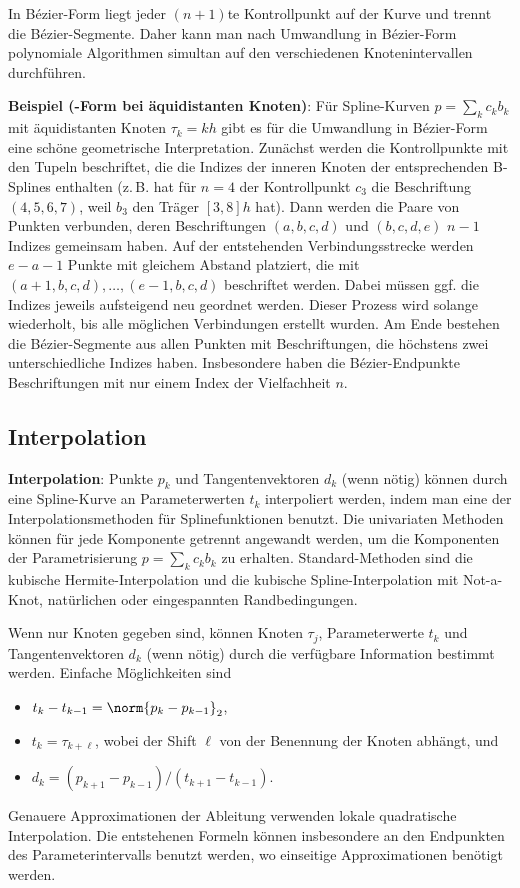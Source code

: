 In Bézier-Form liegt jeder $(n + 1)$te Kontrollpunkt auf der Kurve und trennt die Bézier-Segmente.
Daher kann man nach Umwandlung in Bézier-Form polynomiale Algorithmen simultan auf den
verschiedenen Knotenintervallen durchführen.

\linie
\pagebreak

\textbf{Beispiel (-Form bei äquidistanten Knoten)}:
Für Spline-Kurven $p = \sum_k c_k b_k$ mit äquidistanten Knoten $\tau_k = kh$ gibt es
für die Umwandlung in Bézier-Form eine schöne geometrische Interpretation.
Zunächst werden die Kontrollpunkte mit den Tupeln beschriftet, die die Indizes der inneren Knoten
der entsprechenden B-Splines enthalten (z.\,B. hat für $n = 4$ der Kontrollpunkt
$c_3$ die Beschriftung $(4, 5, 6, 7)$, weil $b_3$ den Träger $[3, 8]h$ hat).
Dann werden die Paare von Punkten verbunden, deren Beschriftungen $(a, b, c, d)$ und
$(b, c, d, e)$ $n - 1$ Indizes gemeinsam haben.
Auf der entstehenden Verbindungsstrecke werden $e - a - 1$ Punkte mit gleichem Abstand platziert,
die mit $(a + 1, b, c, d), \dotsc, (e - 1, b, c, d)$ beschriftet werden.
Dabei müssen ggf. die Indizes jeweils aufsteigend neu geordnet werden.
Dieser Prozess wird solange wiederholt, bis alle möglichen Verbindungen erstellt wurden.
Am Ende bestehen die Bézier-Segmente aus allen Punkten mit Beschriftungen, die höchstens
zwei unterschiedliche Indizes haben.
Insbesondere haben die Bézier-Endpunkte Beschriftungen mit nur einem Index der Vielfachheit $n$.

\subsection{%
    Interpolation%
}

\textbf{Interpolation}:
Punkte $p_k$ und Tangentenvektoren $d_k$ (wenn nötig) können durch eine
Spline-Kurve an Parameterwerten $t_k$ interpoliert werden, indem man eine der
Interpolationsmethoden für Splinefunktionen benutzt.
Die univariaten Methoden können für jede Komponente getrennt angewandt werden,
um die Komponenten der Parametrisierung $p = \sum_k c_k b_k$ zu erhalten.
Standard-Methoden sind die kubische Hermite-Interpolation und die kubische Spline-Interpolation
mit Not-a-Knot, natürlichen oder eingespannten Randbedingungen.

Wenn nur Knoten gegeben sind, können Knoten $\tau_j$, Parameterwerte $t_k$ und
Tangentenvektoren $d_k$ (wenn nötig) durch die verfügbare Information bestimmt werden.
Einfache Möglichkeiten sind
\begin{itemize}
    \item
    $t_k - t_{k-1} = \norm{p_k - p_{k-1}}_2$,

    \item
    $t_k = \tau_{k+\ell}$, wobei der Shift $\ell$ von der Benennung der Knoten abhängt, und

    \item
    $d_k = (p_{k+1} - p_{k-1}) / (t_{k+1} - t_{k-1})$.
\end{itemize}
Genauere Approximationen der Ableitung verwenden lokale quadratische Interpolation.
Die entstehenen Formeln können insbesondere an den Endpunkten des Parameterintervalls benutzt
werden, wo einseitige Approximationen benötigt werden.

